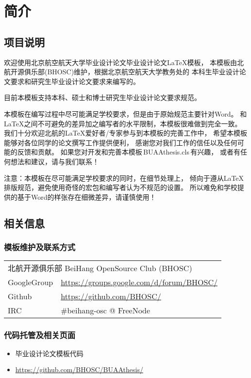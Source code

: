 \chapter{简介}

\section{项目说明}

欢迎使用北京航空航天大学毕业设计论文毕业设计论文\LaTeX{}模板，
本模板由北航开源俱乐部(BHOSC)维护，根据北京航空航天大学教务处的
本科生毕业设计论文要求和研究生毕业设计论文要求来编写的。

目前本模板支持本科、硕士和博士研究生毕业设计论文要求规范。

本模板在编写过程中尽可能满足学校要求，但是由于原始规范主要针对Word。
和\LaTeX{}之间不可避免的差异加之编写者的水平限制，本模板很难做到完全一致。
我们十分欢迎北航的\LaTeX{}爱好者/专家参与到本模板的完善工作中，
希望本模板能够对各位同学的论文撰写工作提供便利，
感谢您对我们工作的信任以及任何可能的反馈和贡献。
如果您对开发和完善本模板\,BUAAthesis.cls\,有兴趣，
或者有任何想法和建议，请与我们联系！

{\heiti 注意：}本模板在尽可能满足学校要求的同时，在细节处理上，
倾向于遵从\LaTeX{}排版规范，避免使用奇怪的宏包和编写者认为不规范的设置。
所以难免和学校提供的基于Word的样张存在细微差异，请谨慎使用！

\section{相关信息}

\subsection{模板维护及联系方式}
\begin{tabular}{ll}
    \multicolumn{2}{l}{北航开源俱乐部 BeiHang OpenSource Club (BHOSC)} \\
    GoogleGroup & \url{https://groups.google.com/d/forum/BHOSC/} \\
    Github      & \url{https://github.com/BHOSC/} \\
    IRC         & \#beihang-osc @ FreeNode
\end{tabular}

\subsection{代码托管及相关页面}
\begin{itemize}
    \item 毕业设计论文模板代码
    \item[] \url{https://github.com/BHOSC/BUAAthesis/}
\end{itemize}

